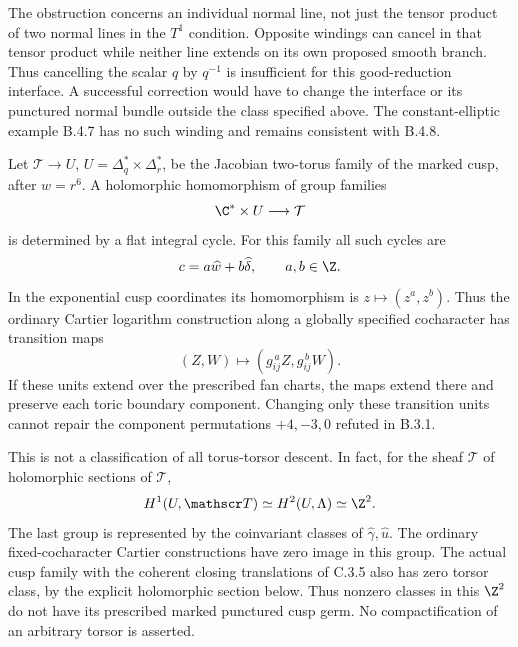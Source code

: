 \begin{remark}
The obstruction concerns an individual normal line,
not just the tensor product of two normal lines in
the $T^1$ condition.  Opposite windings can cancel in
that tensor product while neither line extends on its
own proposed smooth branch.  Thus cancelling the
scalar $q$ by $q^{-1}$ is insufficient for this
good-reduction interface.  A successful correction
would have to change the interface or its punctured
normal bundle outside the class specified above.
The constant-elliptic example B.4.7 has no such
winding and remains consistent with B.4.8.
\end{remark}

\begin{proposition}\label{push:src:B.4.9}
Let $\mathcal T\to U$, $U=\Delta_q^*\times\Delta_r^*$,
be the Jacobian two-torus family of the marked cusp,
after $w=r^6$.  A holomorphic homomorphism of group
families
\[
 \C^*\times U\longrightarrow\mathcal T
\]
is determined by a flat integral cycle.  For this family
all such cycles are
\[
 c=a\widehat w+b\widehat\delta,\qquad a,b\in\Z.
\]
In the exponential cusp coordinates its homomorphism
is $z\mapsto(z^a,z^b)$.  Thus the ordinary Cartier
logarithm construction along a globally specified
cocharacter has transition maps
\[
 (Z,W)\longmapsto(g_{ij}^{\,a}Z,g_{ij}^{\,b}W).
\]
If these units extend over the prescribed fan charts,
the maps extend there and preserve each toric
boundary component.  Changing only these transition
units cannot repair the component permutations
$+4,-3,0$ refuted in B.3.1.

This is not a classification of all torus-torsor
descent.  In fact, for the sheaf $\mathscr T$ of
holomorphic sections of $\mathcal T$,
\[
 H^1(U,\mathscr T)\simeq H^2(U,\Lambda)\simeq\Z^2.
\]
The last group is represented by the coinvariant
classes of $\widehat\gamma,\widehat u$.  The ordinary
fixed-cocharacter Cartier constructions have zero
image in this group.  The actual cusp family with
the coherent closing translations of C.3.5 also
has zero torsor class, by the explicit holomorphic
section below.  Thus nonzero classes in this
$\Z^2$ do not have its prescribed marked punctured
cusp germ.  No compactification of an arbitrary
torsor is asserted.
\end{proposition}
